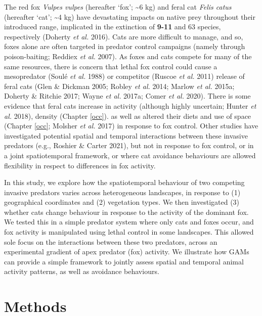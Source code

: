 \documentclass[11pt,a4paper,titlepage,twoside,openright]{style/unimelbthesis}
\begin{document}
\begin{mainmatter}
The red fox \emph{Vulpes vulpes} (hereafter `fox'; \textasciitilde6 kg) and feral cat \emph{Felis catus} (hereafter `cat'; \textasciitilde4 kg) have devastating impacts on native prey throughout their introduced range, implicated in the extinction of \textbf{9-11} and 63 species, respectively (Doherty \emph{et al.} 2016). Cats are more difficult to manage, and so, foxes alone are often targeted in predator control campaigns (namely through poison-baiting; Reddiex \emph{et al.} 2007). As foxes and cats compete for many of the same resources, there is concern that lethal fox control could cause a mesopredator (Soulé \emph{et al.} 1988) or competitor (Ruscoe \emph{et al.} 2011) release of feral cats (Glen \& Dickman 2005; Robley \emph{et al.} 2014; Marlow \emph{et al.} 2015a; Doherty \& Ritchie 2017; Wayne \emph{et al.} 2017a; Comer \emph{et al.} 2020). There is some evidence that feral cats increase in activity (although highly uncertain; Hunter \emph{et al.} 2018), density (Chapter \ref{occ}). as well as altered their diets and use of space (Chapter \ref{occ}; Molsher \emph{et al.} 2017) in response to fox control. Other studies have investigated potential spatial and temporal interactions between these invasive predators (e.g., Roshier \& Carter 2021), but not in response to fox control, or in a joint spatiotemporal framework, or where cat avoidance behaviours are allowed flexibility in respect to differences in fox activity.

In this study, we explore how the spatiotemporal behaviour of two competing invasive predators varies across heterogeneous landscapes, in response to (1) geographical coordinates and (2) vegetation types. We then investigated (3) whether cats change behaviour in response to the activity of the dominant fox. We tested this in a simple predator system where only cats and foxes occur, and fox activity is manipulated using lethal control in some landscapes. This allowed sole focus on the interactions between these two predators, across an experimental gradient of apex predator (fox) activity. We illustrate how GAMs can provide a simple framework to jointly assess spatial and temporal animal activity patterns, as well as avoidance behaviours.

\newpage

\hypertarget{methods-3}{%
\section{Methods}\label{methods-3}}

\hypertarget{study-area-and-camera-trapping-1}{%
}
\end{mainmatter}
\end{document}
